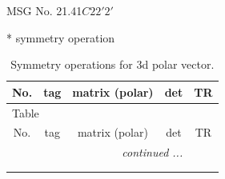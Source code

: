 \documentclass[fleqn,8pt]{jsarticle}
\begin{document}
\setcounter{MaxMatrixCols}{32}

\renewcommand{\tablename}{Table~}
\renewcommand{\figurename}{Figure~}
\begin{center}
\LARGE
MSG No. 21.41\quad$C22'2'$
\end{center}
* symmetry operation
\renewcommand{\arraystretch}{1.3}
\begin{longtable}{ccccc}
\caption{Symmetry operations for 3d polar vector.}
 \\
 \hline \hline
No. & tag & matrix (polar) & det & TR \\ \hline \endfirsthead

\multicolumn{4}{l}{\tablename\ \thetable{}} \\
 \hline \hline
No. & tag & matrix (polar) & det & TR \\ \hline \endhead

 \hline \hline
\multicolumn{4}{r}{\footnotesize\it continued ...} \\ \endfoot

 \hline \hline
\multicolumn{4}{r}{} \\ \endlastfoot


\end{longtable}
\end{document}
